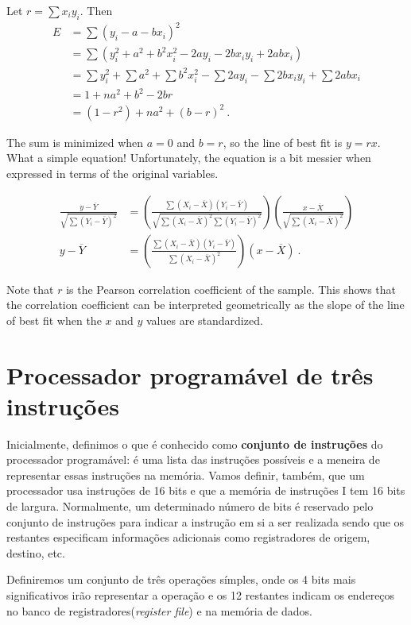 \documentclass{article}
\begin{document}
Let $r = \sum x_i y_i$. Then
\begin{align*}
E &= \sum (y_i - a - bx_i)^2 \\
&= \sum (y_i^2 + a^2 + b^2 x_i^2 - 2ay_i - 2bx_iy_i + 2abx_i) \\
&= \sum y_i^2 + \sum a^2 + \sum b^2 x_i^2 
 - \sum 2ay_i - \sum 2bx_iy_i + \sum 2abx_i \\
&= 1 + na^2 + b^2 - 2br \\
&= (1-r^2) + na^2 + (b - r)^2\ .
\end{align*}

The sum is minimized when $a = 0$ and $b = r$, so the line of best fit is
$y = rx$. What a simple equation!
Unfortunately, the equation is a bit messier when expressed in terms of the
original variables.

\begin{align*}
\frac{y - \overline{Y}}{\sqrt{\sum (Y_i - \overline{Y})^2}}
&= \left(
     \frac{\sum (X_i - \overline{X}) (Y_i - \overline{Y})}
          {\sqrt{\sum (X_i - \overline{X})^2 \sum (Y_i - \overline{Y})^2}}
   \right)
   \left(
     \frac{x - \overline{X}}
          {\sqrt{\sum (X_i - \overline{X})^2}}
   \right)\\
y - \overline{Y} &=
\left(
     \frac{\sum (X_i - \overline{X}) (Y_i - \overline{Y})}
          {\sum (X_i - \overline{X})^2}
   \right)
   (x - \overline{X})\ .
\end{align*}

Note that $r$ is the Pearson correlation coefficient of the sample.
This shows that the correlation coefficient can be interpreted geometrically
as the slope of the line of best fit when the $x$ and $y$ values are standardized.
\fi

\newpage
\section{Processador programável  de três instruções}
Inicialmente, definimos o que é conhecido como \textbf{conjunto de instruções} do processador programável: é uma lista das instruções possíveis e a meneira de representar essas instruções na memória.
Vamos definir, também, que um processador usa instruções de 16 bits e que a memória de instruções I tem 16 bits de largura. Normalmente, um determinado número de bits é reservado pelo conjunto de instruções para indicar a instrução em si a ser realizada sendo que os restantes especificam informações adicionais como registradores de origem, destino, etc.

Definiremos um conjunto de três operações símples, onde os 4 bits mais significativos irão representar a operação e os 12 restantes indicam os endereços no banco de registradores(\textit{register file}) e na memória de dados.
\end{document}
